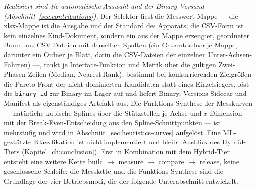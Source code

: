 \begin{nurlang}
\emph{Realisiert sind die automatische Auswahl und der Binary-Versand (Abschnitt~\ref{sec:contributions}).}
Der Selektor liest die Messwert-Mappe ---
die xlsx-Mappe ist die Ausgabe und der Standard des Apparats; die CSV-Form ist kein einzelnes
Kind-Dokument, sondern ein aus der Mappe erzeugter, geordneter Baum aus CSV-Dateien mit denselben Spalten
(ein Gesamtordner je Mappe, darunter ein Ordner je Blatt, darin die CSV-Dateien der einzelnen
Unter-Achsen-Fahrten) ---, rankt je
Interface-Funktion und Metrik über die gültigen Zwei-Phasen-Zeilen (Median, Nearest-Rank), bestimmt bei
konkurrierenden Zielgrößen die Pareto-Front der nicht-dominierten Kandidaten statt eines Einzelsiegers,
löst die \texttt{binary\_id} zur Binary im Lager auf und liefert Binary, Versions-Sidecar und Manifest
als eigenständiges Artefakt aus.
Die Funktions-Synthese der Messkurven --- natürliche kubische Splines über die Stützstellen je Achse und
$x$-Dimension mit der Break-Even-Entscheidung aus den Spline-Schnittpunkten --- ist mehrstufig und wird in
Abschnitt~\ref{sec:heuristics-curves} aufgelöst. Eine ML-gestützte Klassifikation ist nicht implementiert und
bleibt Ausblick des Hybrid-Tiers (Kapitel~\ref{ch:conclusion}). Erst in Kombination mit dem Hybrid-Tier
entsteht eine weitere Kette build $\to$ measure $\to$ compare $\to$ release, keine geschlossene Schleife;
die Messkette und die Funktions-Synthese sind die Grundlage der vier Betriebsmodi, die der folgende
Unterabschnitt entwickelt.
\end{nurlang}
